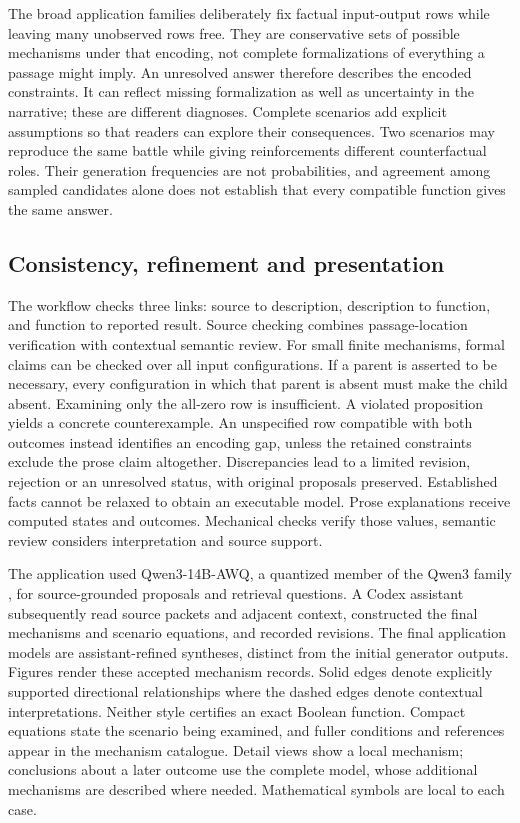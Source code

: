 \documentclass{svproc}
\begin{document}
The broad application families deliberately fix factual input-output rows while leaving many unobserved rows free. They are conservative sets of possible mechanisms under that encoding, not complete formalizations of everything a passage might imply. An unresolved answer therefore describes the encoded constraints. It can reflect missing formalization as well as uncertainty in the narrative; these are different diagnoses. Complete scenarios add explicit assumptions so that readers can explore their consequences. Two scenarios may reproduce the same battle while giving reinforcements different counterfactual roles. Their generation frequencies are not probabilities, and agreement among sampled candidates alone does not establish that every compatible function gives the same answer.

\subsection{Consistency, refinement and presentation}
The workflow checks three links: source to description, description to function, and function to reported result. Source checking combines passage-location verification with contextual semantic review. For small finite mechanisms, formal claims can be checked over all input configurations. If a parent is asserted to be necessary, every configuration in which that parent is absent must make the child absent. Examining only the all-zero row is insufficient. A violated proposition yields a concrete counterexample. An unspecified row compatible with both outcomes instead identifies an encoding gap, unless the retained constraints exclude the prose claim altogether.
Discrepancies lead to a limited revision, rejection or an unresolved status, with original proposals preserved. Established facts cannot be relaxed to obtain an executable model. Prose explanations receive computed states and outcomes. Mechanical checks verify those values, semantic review considers interpretation and source support.

The application used Qwen3-14B-AWQ, a quantized member of the Qwen3 family \cite{qwen2025}, for source-grounded proposals and retrieval questions. A Codex assistant subsequently read source packets and adjacent context, constructed the final mechanisms and scenario equations, and recorded revisions. The final application models are assistant-refined syntheses, distinct from the initial generator outputs.
Figures render these accepted mechanism records. Solid edges denote explicitly supported directional relationships where the dashed edges denote contextual interpretations. Neither style certifies an exact Boolean function. Compact equations state the scenario being examined, and fuller conditions and references appear in the mechanism catalogue. Detail views show a local mechanism; conclusions about a later outcome use the complete model, whose additional mechanisms are described where needed. Mathematical symbols are local to each case.
\end{document}
